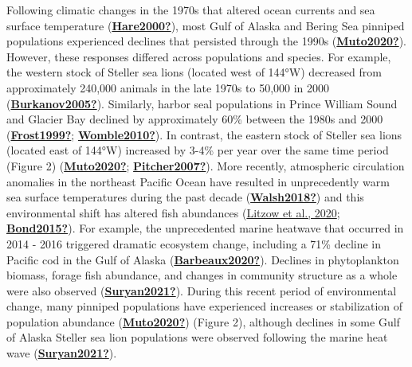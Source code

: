 \documentclass [11pt, proquest] {uwthesis}[2015/03/03]
\begin{document}
Following climatic changes in the 1970s that altered ocean currents and sea surface temperature (\protect\hyperlink{ref-Hare2000}{\textbf{Hare2000?}}), most Gulf of Alaska and Bering Sea pinniped populations experienced declines that persisted through the 1990s (\protect\hyperlink{ref-Muto2020}{\textbf{Muto2020?}}). However, these responses differed across populations and species. For example, the western stock of Steller sea lions (located west of 144°W) decreased from approximately 240,000 animals in the late 1970s to 50,000 in 2000 (\protect\hyperlink{ref-Burkanov2005}{\textbf{Burkanov2005?}}). Similarly, harbor seal populations in Prince William Sound and Glacier Bay declined by approximately 60\% between the 1980s and 2000 (\protect\hyperlink{ref-Frost1999}{\textbf{Frost1999?}}; \protect\hyperlink{ref-Womble2010}{\textbf{Womble2010?}}). In contrast, the eastern stock of Steller sea lions (located east of 144°W) increased by 3-4\% per year over the same time period (Figure 2) (\protect\hyperlink{ref-Muto2020}{\textbf{Muto2020?}}; \protect\hyperlink{ref-Pitcher2007}{\textbf{Pitcher2007?}}). More recently, atmospheric circulation anomalies in the northeast Pacific Ocean have resulted in unprecedently warm sea surface temperatures during the past decade (\protect\hyperlink{ref-Walsh2018}{\textbf{Walsh2018?}}) and this environmental shift has altered fish abundances (\protect\hyperlink{ref-Litzow2020}{Litzow et al., 2020}; \protect\hyperlink{ref-Bond2015}{\textbf{Bond2015?}}). For example, the unprecedented marine heatwave that occurred in 2014 - 2016 triggered dramatic ecosystem change, including a 71\% decline in Pacific cod in the Gulf of Alaska (\protect\hyperlink{ref-Barbeaux2020}{\textbf{Barbeaux2020?}}). Declines in phytoplankton biomass, forage fish abundance, and changes in community structure as a whole were also observed (\protect\hyperlink{ref-Suryan2021}{\textbf{Suryan2021?}}). During this recent period of environmental change, many pinniped populations have experienced increases or stabilization of population abundance (\protect\hyperlink{ref-Muto2020}{\textbf{Muto2020?}}) (Figure 2), although declines in some Gulf of Alaska Steller sea lion populations were observed following the marine heat wave (\protect\hyperlink{ref-Suryan2021}{\textbf{Suryan2021?}}).
\end{document}
